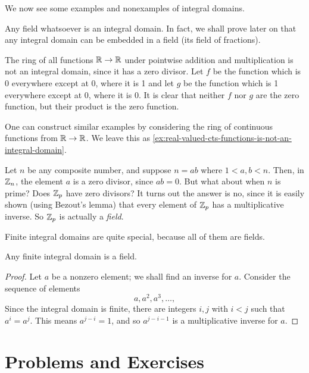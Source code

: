 \documentclass[./main.tex]{subfiles}
\begin{document}
We now see some examples and nonexamples of integral domains.

\begin{example}
    Any field whatsoever is an integral domain. In fact, we shall prove later on
    that any integral domain can be embedded in a field (its field of fractions).
\end{example}

\begin{example}
    The ring of all functions $\mathbb{R} \to \mathbb{R}$ under pointwise addition and
    multiplication is not an integral domain, since it has a zero divisor. Let
    $f$ be the function which is 0 everywhere except at $0$, where it is 1 and
    let $g$ be the function which is 1 everywhere except at 0, where it is 0. It
    is clear that neither $f$ nor $g$ are the zero function, but their product
    is the zero function.
\end{example}

One can construct similar examples by considering the ring of continuous
functions from $\mathbb{R} \to \mathbb{R}$. We leave this as \cref{ex:real-valued-cts-functions-is-not-an-integral-domain}.

\begin{example}
    Let $n$ be any composite number, and suppose $n = ab$ where $1 < a,b < n$.
    Then, in $\mathbb{Z}_n$, the element $a$ is a zero divisor, since $ab = 0$. But
    what about when $n$ is prime? Does $\mathbb{Z}_p$ have zero divisors? It turns out
    the answer is no, since it is easily shown (using Bezout's lemma) that every
    element of $\mathbb{Z}_p$ has a multiplicative inverse. So $\mathbb{Z}_p$ is actually a
    \emph{field}.
\end{example}

Finite integral domains are quite special, because all of them are fields.
\begin{proposition}
    Any finite integral domain is a field.
\end{proposition}
\begin{proof}
    Let $a$ be a nonzero element; we shall find an inverse for $a$. Consider the
    sequence of elements
    \[
        a, a^2, a^3, \dots,
    \]
    Since the integral domain is finite, there are integers $i, j$ with $i < j$
    such that $a^i = a^j$. This means $a^{j-i} = 1$, and so $a^{j-i-1}$ is a
    multiplicative inverse for $a$.
\end{proof}


\section{Problems and Exercises}
\end{document}
